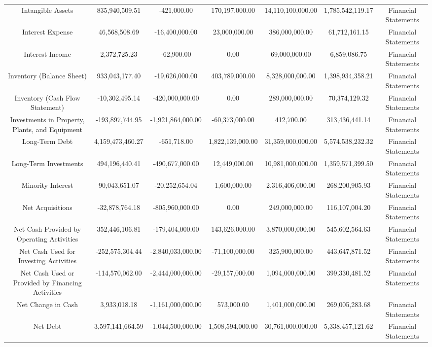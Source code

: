 \begin{longtable}{ccccccc}
Intangible Assets & 835,940,509.51 & -421,000.00 & 170,197,000.00 & 14,110,100,000.00 & 1,785,542,119.17 & Financial Statements \\
Interest Expense & 46,568,508.69 & -16,400,000.00 & 23,000,000.00 & 386,000,000.00 & 61,712,161.15 & Financial Statements \\
Interest Income & 2,372,725.23 & -62,900.00 & 0.00 & 69,000,000.00 & 6,859,086.75 & Financial Statements \\
Inventory (Balance Sheet) & 933,043,177.40 & -19,626,000.00 & 403,789,000.00 & 8,328,000,000.00 & 1,398,934,358.21 & Financial Statements \\
Inventory (Cash Flow Statement) & -10,302,495.14 & -420,000,000.00 & 0.00 & 289,000,000.00 & 70,374,129.32 & Financial Statements \\
Investments in Property, Plants, and Equipment & -193,897,744.95 & -1,921,864,000.00 & -60,373,000.00 & 412,700.00 & 313,436,441.14 & Financial Statements \\
Long-Term Debt & 4,159,473,460.27 & -651,718.00 & 1,822,139,000.00 & 31,359,000,000.00 & 5,574,538,232.32 & Financial Statements \\
Long-Term Investments & 494,196,440.41 & -490,677,000.00 & 12,449,000.00 & 10,981,000,000.00 & 1,359,571,399.50 & Financial Statements \\
Minority Interest & 90,043,651.07 & -20,252,654.04 & 1,600,000.00 & 2,316,406,000.00 & 268,200,905.93 & Financial Statements \\
Net Acquisitions & -32,878,764.18 & -805,960,000.00 & 0.00 & 249,000,000.00 & 116,107,004.20 & Financial Statements \\
Net Cash Provided by Operating Activities & 352,446,106.81 & -179,404,000.00 & 143,626,000.00 & 3,870,000,000.00 & 545,602,564.63 & Financial Statements \\
Net Cash Used for Investing Activities & -252,575,304.44 & -2,840,033,000.00 & -71,100,000.00 & 325,900,000.00 & 443,647,871.52 & Financial Statements \\
Net Cash Used or Provided by Financing Activities & -114,570,062.00 & -2,444,000,000.00 & -29,157,000.00 & 1,094,000,000.00 & 399,330,481.52 & Financial Statements \\
Net Change in Cash & 3,933,018.18 & -1,161,000,000.00 & 573,000.00 & 1,401,000,000.00 & 269,005,283.68 & Financial Statements \\
Net Debt & 3,597,141,664.59 & -1,044,500,000.00 & 1,508,594,000.00 & 30,761,000,000.00 & 5,338,457,121.62 & Financial Statements \\

\end{longtable}
